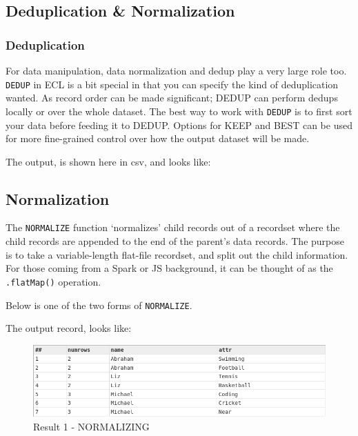 \documentclass[a4paper,oneside,12pt]{book}
\begin{document}
\subsection{Deduplication \& Normalization}

\subsubsection{Deduplication}

For data manipulation, data normalization and dedup play a very large role too. \lstinline{DEDUP} in ECL is a bit special in that you can specify the kind of deduplication wanted. As record order can be made significant; DEDUP can perform dedups locally or over the whole dataset.
The best way to work with \lstinline{DEDUP} is to first sort your data before feeding it to DEDUP. Options for KEEP and BEST can be used for more fine-grained control over how the output dataset will be made.



The output, is shown here in csv, and looks like:








\subsection{Normalization}

The \lstinline{NORMALIZE} function `normalizes' child records out of a recordset where the child records are appended to the end of the parent's data records. The purpose is to take a variable-length flat-file recordset, and split out the child information. For those coming from a Spark or JS background, it can be thought of as the \lstinline{.flatMap()} operation. 

Below is one of the two forms of \lstinline{NORMALIZE}.



The output record, looks like:

\begin{figure}[h]
    \centering
    \includegraphics[width=.8\linewidth]{../output/28/1}
    \caption{Result 1 - NORMALIZING}
\end{figure}
\end{document}
